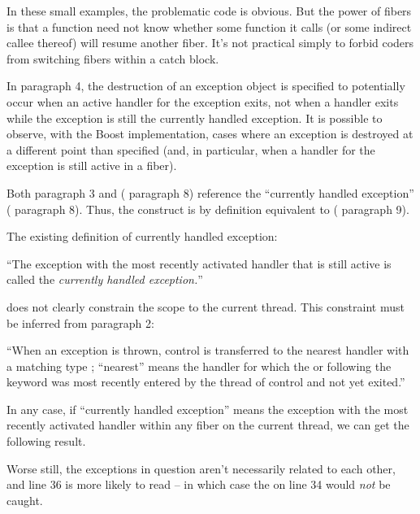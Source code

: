 In these small examples, the problematic code is obvious. But the power of
fibers is that a function need not know whether some function it calls (or
some indirect callee thereof) will resume another fiber. It's not practical
simply to forbid coders from switching fibers within a catch block.


In  paragraph 4, the destruction of an exception object is
specified to potentially occur when an active handler for the exception exits,
not when a handler exits while the exception is still the currently handled
exception. It is possible to observe, with the Boost implementation, cases
where an exception is destroyed at a different point than specified (and, in
particular, when a handler for the exception is still active in a fiber).



Both  paragraph 3 and 
( paragraph 8) reference the ``currently handled
exception'' ( paragraph 8). Thus, the
construct  is by definition equivalent to
( paragraph 9).

The existing definition of currently handled exception:

``The exception with the most recently activated handler that is still active
is called the \emph{currently handled exception.}''

does not clearly constrain the scope to the current thread. This constraint
must be inferred from  paragraph 2:

``When an exception is thrown, control is transferred to the nearest handler
with a matching type ; ``nearest'' means the handler for
which the  or
 following the  keyword was
most recently entered by the thread of control and not yet exited.''

In any case, if ``currently handled exception'' means the exception with the
most recently activated handler within any fiber on the current thread, we can
get the following result.


Worse still, the exceptions in question aren't necessarily related to each
other, and line 36 is more likely to read  --
in which case the  on line 34 would \emph{not} be caught.
